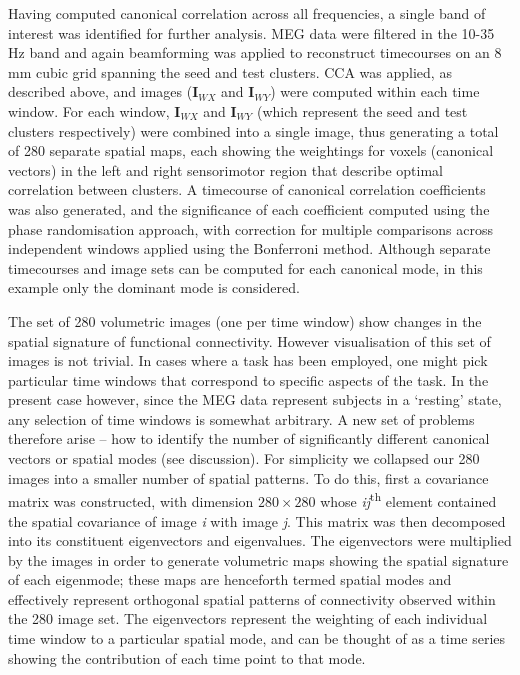 Having computed canonical correlation across all frequencies, a single band of interest was identified for further analysis. MEG data were filtered in the 10-35 Hz band and again beamforming was applied to reconstruct timecourses on an 8 mm cubic grid spanning the seed and test clusters. CCA was applied, as described above, and images ($\mathbf{I}_{WX}$ and $\mathbf{I}_{WY}$) were computed within each time window. For each window, $\mathbf{I}_{WX}$ and $\mathbf{I}_{WY}$ (which represent the seed and test clusters respectively) were combined into a single image, thus generating a total of 280 separate spatial maps, each showing the weightings for voxels (canonical vectors) in the left and right sensorimotor region that describe optimal correlation between clusters. A timecourse of canonical correlation coefficients was also generated, and the significance of each coefficient computed using the phase randomisation approach, with correction for multiple comparisons across independent windows applied using the Bonferroni method. Although separate timecourses and image sets can be computed for each canonical mode, in this example only the dominant mode is considered. 

The set of 280 volumetric images (one per time window) show changes in the spatial signature of functional connectivity. However visualisation of this set of images is not trivial. In cases where a task has been employed, one might pick particular time windows that correspond to specific aspects of the task. In the present case however, since the MEG data represent subjects in a ‘resting’ state, any selection of time windows is somewhat arbitrary. A new set of problems therefore arise – how to identify the number of significantly different canonical vectors or spatial modes (see discussion). For simplicity we collapsed our 280 images into a smaller number of spatial patterns. To do this, first a covariance matrix was constructed, with dimension $280 \times 280$ whose \textit{ij}\textsuperscript{th} element contained the spatial covariance of image \textit{i} with image \textit{j}. This matrix was then decomposed into its constituent eigenvectors and eigenvalues. The eigenvectors were multiplied by the images in order to generate volumetric maps showing the spatial signature of each eigenmode; these maps are henceforth termed spatial modes and effectively represent orthogonal spatial patterns of connectivity observed within the 280 image set. The eigenvectors represent the weighting of each individual time window to a particular spatial mode, and can be thought of as a time series showing the contribution of each time point to that mode.

